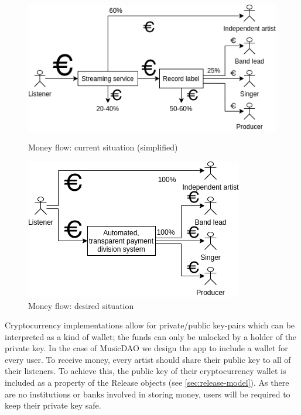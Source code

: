 \begin{figure}
        \includegraphics[width=\linewidth]{design/current-money-flow.png}
        \caption{Money flow: current situation (simplified)}
        \label{fig:current-money-flow}
    \endminipage\hfill
        \includegraphics[width=\linewidth]{design/desired-money-flow.png}
        \caption{Money flow: desired situation}
        \label{fig:desired-money-flow}
    \endminipage
\end{figure}
Cryptocurrency implementations allow for private/public key-pairs which can be interpreted as a kind of wallet; the funds can only be unlocked by a holder of the private key. In the case of MusicDAO we design the app to include a wallet for every user. To receive money, every artist should share their public key to all of their listeners. To achieve this, the public key of their cryptocurrency wallet is included as a property of the Release objects (see \ref{sec:release-model}). As there are no institutions or banks involved in storing money, users will be required to keep their private key safe.

